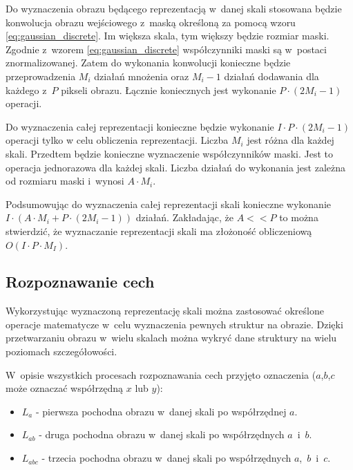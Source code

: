 Do wyznaczenia obrazu będącego reprezentacją w~danej skali stosowana będzie konwolucja obrazu wejściowego z~maską określoną za pomocą wzoru \ref{eq:gaussian_discrete}. Im większa skala, tym większy będzie rozmiar maski. Zgodnie z~wzorem \ref{eq:gaussian_discrete} współczynniki maski są w~postaci znormalizowanej. Zatem do wykonania konwolucji konieczne będzie przeprowadzenia $ M_i $ działań mnożenia oraz $ M_i - 1 $ działań dodawania dla każdego z~$P$ pikseli obrazu. Łącznie koniecznych jest wykonanie $ P \cdot (2M_i - 1) $ operacji.

Do wyznaczenia całej reprezentacji konieczne będzie wykonanie 
$ I \cdot P \cdot (2M_i - 1) $ operacji tylko w celu obliczenia reprezentacji. Liczba $ M_i $ jest różna dla każdej skali. Przedtem będzie konieczne wyznaczenie współczynników maski. Jest to operacja jednorazowa dla każdej skali. Liczba działań do wykonania jest zależna od rozmiaru maski i~wynosi $ A \cdot M_i $.

Podsumowując do wyznaczenia całej reprezentacji skali konieczne wykonanie $ I \cdot (A \cdot M_i + P \cdot (2M_i - 1)) $ działań. Zakładając, że $ A << P $ to można stwierdzić, że wyznaczanie reprezentacji skali ma złożoność obliczeniową $ O(I \cdot P \cdot M_I) $.

\subsection{Rozpoznawanie cech}
\label{subsec:rozpoznawanie}

Wykorzystując wyznaczoną reprezentację skali można zastosować określone operacje matematycze w~celu wyznaczenia pewnych struktur na obrazie. Dzięki przetwarzaniu obrazu w~wielu skalach można wykryć dane struktury na wielu poziomach szczegółowości.

W~opisie wszystkich procesach rozpoznawania cech przyjęto oznaczenia ($ a$,$ b$,$ c $ może oznaczać współrzędną $ x $ lub $ y $):

\begin{itemize}
\item $ L_a $ - pierwsza pochodna obrazu w~danej skali po współrzędnej $ a $.
\item $ L_{ab} $ - druga pochodna obrazu w~danej skali po współrzędnych $ a $~i~$b$.
\item $ L_{abc} $ - trzecia pochodna obrazu w~danej skali po współrzędnych $ a $,~$b$~i~$c$.
\end{itemize}

